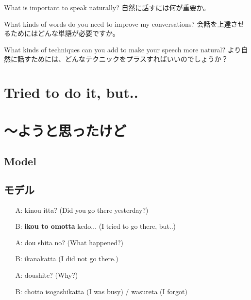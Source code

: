 \documentclass[uplatex,dvipdfmx,b5paper,english,10pt]{jsbook}
\begin{document}
\begin{toiquestion}
\ifEnglish
What is important to speak naturally?
\else
自然に話すには何が重要か。
\fi
\end{toiquestion}
\begin{toiquestion}
\ifEnglish
What kinds of words do you need to improve my conversations?
\else
会話を上達させるためにはどんな単語が必要ですか。
\fi
\end{toiquestion}
\begin{toiquestion}
\ifEnglish
What kinds of techniques can you add to make your speech more natural?
\else
より自然に話すためには、どんなテクニックをプラスすればいいのでしょうか？
\fi
\end{toiquestion}

%
%


\ifEnglish %
\section{Tried to do it, but..}
\else
\section{〜ようと思ったけど}
\fi



\ifEnglish
\subsection{Model}
\else
\subsection{モデル}
\fi

\begin{itemize}
 \item[A:] kinou itta? (Did you go there yesterday?)
 \item[B:] {\bfseries ikou to omotta} kedo... (I tried to go there, but..)
 \item[A:] dou shita no? (What happened?)
 \item[B:] ikanakatta (I did not go there.)
 \item[A:] doushite? (Why?)
 \item[B:] chotto isogashikatta (I was busy) / wasureta (I forgot)
\end{itemize}
\end{document}
